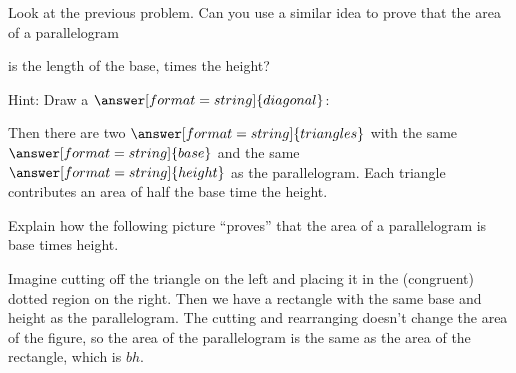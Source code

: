 \documentclass[nooutcomes]{ximera}
\begin{document}
\begin{problem}
Look at the previous problem. Can you use a similar idea
  to prove that the area of a parallelogram
\begin{image}
\end{image}
is the length of the base, times the height?
\begin{freeResponse}
\end{freeResponse}
\begin{problem}
Hint:  Draw a $\answer[format=string]{diagonal}$:  
\begin{image}
\end{image}
Then there are two $\answer[format=string]{triangles}$ with the same $\answer[format=string]{base}$ and 
the same $\answer[format=string]{height}$ as the parallelogram.  Each triangle contributes an area of half the base time the height.
\end{problem}
\end{problem}

\begin{problem}
Explain how the following picture ``proves'' that the area of a
  parallelogram is base times height.
\begin{image}
\end{image}
\begin{freeResponse}
\begin{hint}
Imagine cutting off the triangle on the left and placing it in the (congruent) dotted region on the right.  Then we have a rectangle with the same base and height as the parallelogram.  The cutting and rearranging doesn't change the area of the figure, so the area of the parallelogram is the same as the area of the rectangle, which is $bh$. 
\end{hint}
\end{freeResponse}
\end{problem}
\end{document}
